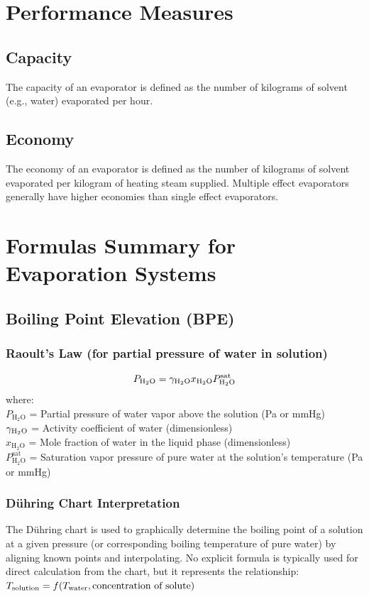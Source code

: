 \section{Performance Measures}

\subsection{Capacity}
The capacity of an evaporator is defined as the number of kilograms of solvent (e.g., water) evaporated per hour.

\subsection{Economy}
The economy of an evaporator is defined as the number of kilograms of solvent evaporated per kilogram of heating steam supplied. Multiple effect evaporators generally have higher economies than single effect evaporators.

\section{Formulas Summary for Evaporation Systems}

\subsection{Boiling Point Elevation (BPE)}
\subsubsection*{Raoult's Law (for partial pressure of water in solution)}
\begin{equation}
    P_{\text{H}_2\text{O}} = \gamma_{\text{H}_2\text{O}} x_{\text{H}_2\text{O}} P_{\text{H}_2\text{O}}^{\text{sat}}
\end{equation}
where: \\
$P_{\text{H}_2\text{O}}$ = Partial pressure of water vapor above the solution (Pa or mmHg) \\
$\gamma_{\text{H}_2\text{O}}$ = Activity coefficient of water (dimensionless) \\
$x_{\text{H}_2\text{O}}$ = Mole fraction of water in the liquid phase (dimensionless) \\
$P_{\text{H}_2\text{O}}^{\text{sat}}$ = Saturation vapor pressure of pure water at the solution's temperature (Pa or mmHg)

\subsubsection*{Dühring Chart Interpretation}
The Dühring chart is used to graphically determine the boiling point of a solution at a given pressure (or corresponding boiling temperature of pure water) by aligning known points and interpolating. No explicit formula is typically used for direct calculation from the chart, but it represents the relationship:
$T_{\text{solution}} = f(T_{\text{water}}, \text{concentration of solute})$

